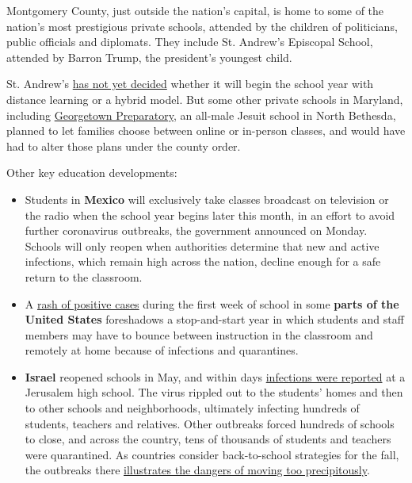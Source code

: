 Montgomery County, just outside the nation's capital, is home to some of
the nation's most prestigious private schools, attended by the children
of politicians, public officials and diplomats. They include St.
Andrew's Episcopal School, attended by Barron Trump, the president's
youngest child.

St. Andrew's \href{https://www.saes.org/covid-19-information}{has not
yet decided} whether it will begin the school year with distance
learning or a hybrid model. But some other private schools in Maryland,
including
\href{https://www.gprep.org/about/news/~post/response-to-the-montgomery-county-health-departments-july-31-directive-20200803}{Georgetown
Preparatory}, an all-male Jesuit school in North Bethesda, planned to
let families choose between online or in-person classes, and would have
had to alter those plans under the county order.

Other key education developments:

\begin{itemize}
\item
  Students in \textbf{Mexico} will exclusively take classes broadcast on
  television or the radio when the school year begins later this month,
  in an effort to avoid further coronavirus outbreaks, the government
  announced on Monday. Schools will only reopen when authorities
  determine that new and active infections, which remain high across the
  nation, decline enough for a safe return to the classroom.
\item
  A
  \href{https://www.nytimes.com/2020/08/03/us/school-closing-coronavirus.html}{rash
  of positive cases} during the first week of school in some
  \textbf{parts of the United States} foreshadows a stop-and-start year
  in which students and staff members may have to bounce between
  instruction in the classroom and remotely at home because of
  infections and quarantines.
\item
  \textbf{Israel} reopened schools in May, and within days
  \href{https://www.nytimes.com/2020/08/04/world/middleeast/coronavirus-israel-schools-reopen.html}{infections
  were reported} at a Jerusalem high school. The virus rippled out to
  the students' homes and then to other schools and neighborhoods,
  ultimately infecting hundreds of students, teachers and relatives.
  Other outbreaks forced hundreds of schools to close, and across the
  country, tens of thousands of students and teachers were quarantined.
  As countries consider back-to-school strategies for the fall, the
  outbreaks there
  \href{https://www.nytimes.com/2020/08/04/world/middleeast/coronavirus-israel-schools-reopen.html}{illustrates
  the dangers of moving too precipitously}.
\end{itemize}

